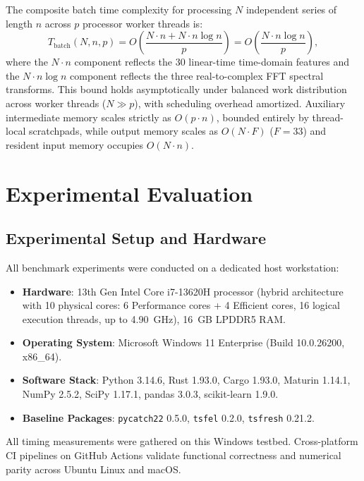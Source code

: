 \documentclass[conference]{IEEEtran}
\begin{document}
The composite batch time complexity for processing $N$ independent series of length $n$ across $p$ processor worker threads is:
\begin{equation}
\label{eq:batch_complexity}
T_{\text{batch}}(N, n, p) = O\left(\frac{N \cdot n + N \cdot n \log n}{p}\right) = O\left(\frac{N \cdot n \log n}{p}\right),
\end{equation}
where the $N \cdot n$ component reflects the 30 linear-time time-domain features and the $N \cdot n \log n$ component reflects the three real-to-complex FFT spectral transforms. This bound holds asymptotically under balanced work distribution across worker threads ($N \gg p$), with scheduling overhead amortized. Auxiliary intermediate memory scales strictly as $O(p \cdot n)$, bounded entirely by thread-local scratchpads, while output memory scales as $O(N \cdot F)$ ($F=33$) and resident input memory occupies $O(N \cdot n)$.

\section{Experimental Evaluation}
\label{sec:experiments}

\subsection{Experimental Setup and Hardware}
All benchmark experiments were conducted on a dedicated host workstation:
\begin{itemize}
    \item \textbf{Hardware}: 13th Gen Intel Core i7-13620H processor (hybrid architecture with 10 physical cores: 6 Performance cores + 4 Efficient cores, 16 logical execution threads, up to 4.90~GHz), 16~GB LPDDR5 RAM.
    \item \textbf{Operating System}: Microsoft Windows 11 Enterprise (Build 10.0.26200, x86\_64).
    \item \textbf{Software Stack}: Python 3.14.6, Rust 1.93.0, Cargo 1.93.0, Maturin 1.14.1, NumPy 2.5.2, SciPy 1.17.1, pandas 3.0.3, scikit-learn 1.9.0.
    \item \textbf{Baseline Packages}: \texttt{pycatch22} 0.5.0, \texttt{tsfel} 0.2.0, \texttt{tsfresh} 0.21.2.
\end{itemize}
All timing measurements were gathered on this Windows testbed. Cross-platform CI pipelines on GitHub Actions validate functional correctness and numerical parity across Ubuntu Linux and macOS.
\end{document}
